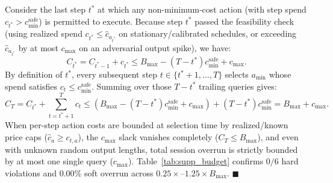 \documentclass[10pt,twocolumn,letterpaper]{article}
\begin{document}
Consider the last step $t^*$ at which any non-minimum-cost action (with step spend $c_{t^*} > c_{\min}^{\text{safe}}$) is permitted to execute. Because step $t^*$ passed the feasibility check (using realized spend $c_{t^*} \le \hat{c}_{a_{t^*}}$ on stationary/calibrated schedules, or exceeding $\hat{c}_{a_{t^*}}$ by at most $c_{\max}$ on an adversarial output spike), we have:
\begin{equation}
C_{t^*} = C_{t^*-1} + c_{t^*} \le B_{\max} - (T - t^*) c_{\min}^{\text{safe}} + c_{\max}.
\end{equation}
By definition of $t^*$, every subsequent step $t \in \{t^*+1, \dots, T\}$ selects $a_{\min}$ whose spend satisfies $c_t \le c_{\min}^{\text{safe}}$. Summing over those $T - t^*$ trailing queries gives:
\begin{equation}
C_T = C_{t^*} + \sum_{t = t^*+1}^{T} c_t \le \left( B_{\max} - (T - t^*) c_{\min}^{\text{safe}} + c_{\max} \right) + (T - t^*) c_{\min}^{\text{safe}} = B_{\max} + c_{\max}.
\end{equation}
When per-step action costs are bounded at selection time by realized/known price caps ($\hat{c}_a \ge c_{t,a}$), the $c_{\max}$ slack vanishes completely ($C_T \le B_{\max}$), and even with unknown random output lengths, total session overrun is strictly bounded by at most one single query ($c_{\max}$). Table~\ref{tab:supp_budget} confirms $0/6$ hard violations and $0.00\%$ soft overrun across $0.25\times$--$1.25\times B_{\max}$. \hfill $\blacksquare$
\end{document}
